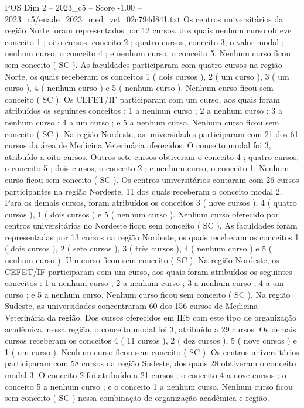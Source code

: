 \begin{textsample}{POS Dim 2 – 2023\_c5 – Score -1.00 – 2023\_c5/enade\_2023\_med\_vet\_02c794d841.txt}
Os centros universitários da região Norte foram representados por 12 cursos, dos quais nenhum curso obteve conceito 1 ; oito cursos, conceito 2 ; quatro cursos, conceito 3, o valor modal ; nenhum curso, o conceito 4 ; e nenhum curso, o conceito 5.
Nenhum curso ficou sem conceito ( SC ).
As faculdades participaram com quatro cursos na região Norte, os quais receberam os conceitos 1 ( dois cursos ), 2 ( um curso ), 3 ( um curso ), 4 ( nenhum curso ) e 5 ( nenhum curso ).
Nenhum curso ficou sem conceito ( SC ).
Os CEFET/IF participaram com um curso, aos quais foram atribuídos os seguintes conceitos : 1 a nenhum curso ; 2 a nenhum curso ; 3 a nenhum curso ; 4 a um curso ; e 5 a nenhum curso.
Nenhum curso ficou sem conceito ( SC ).
Na região Nordeste, as universidades participaram com 21 dos 61 cursos da área de Medicina Veterinária oferecidos.
O conceito modal foi 3, atribuído a oito cursos.
Outros sete cursos obtiveram o conceito 4 ; quatro cursos, o conceito 5 ; dois cursos, o conceito 2 ; e nenhum curso, o conceito 1.
Nenhum curso ficou sem conceito ( SC ).
Os centros universitários contaram com 26 cursos participantes na região Nordeste, 11 dos quais receberam o conceito modal 2.
Para os demais cursos, foram atribuídos os conceitos 3 ( nove cursos ), 4 ( quatro cursos ), 1 ( dois cursos ) e 5 ( nenhum curso ).
Nenhum curso oferecido por centros universitários no Nordeste ficou sem conceito ( SC ).
As faculdades foram representadas por 13 cursos na região Nordeste, os quais receberam os conceitos 1 ( dois cursos ), 2 ( sete cursos ), 3 ( três cursos ), 4 ( nenhum curso ) e 5 ( nenhum curso ).
Um curso ficou sem conceito ( SC ).
Na região Nordeste, os CEFET/IF participaram com um curso, aos quais foram atribuídos os seguintes conceitos : 1 a nenhum curso ; 2 a nenhum curso ; 3 a nenhum curso ; 4 a um curso ; e 5 a nenhum curso.
Nenhum curso ficou sem conceito ( SC ).
Na região Sudeste, as universidades concentraram 60 dos 156 cursos de Medicina Veterinária da região.
Dos cursos oferecidos em IES com este tipo de organização acadêmica, nessa região, o conceito modal foi 3, atribuído a 29 cursos.
Os demais cursos receberam os conceitos 4 ( 11 cursos ), 2 ( dez cursos ), 5 ( nove cursos ) e 1 ( um curso ).
Nenhum curso ficou sem conceito ( SC ).
Os centros universitários participaram com 58 cursos na região Sudeste, dos quais 28 obtiveram o conceito modal 3.
O conceito 2 foi atribuído a 21 cursos ; o conceito 4 a nove cursos ; o conceito 5 a nenhum curso ; e o conceito 1 a nenhum curso.
Nenhum curso ficou sem conceito ( SC ) nessa combinação de organização acadêmica e região.

\end{textsample}
